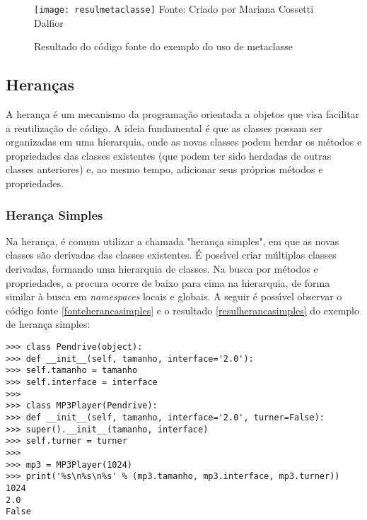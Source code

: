 \begin{figure}[H]
	\begin{center}
		\caption{Resultado do c\'{o}digo fonte do exemplo do uso de metaclasse} \label{resulmetaclasse}
		\texttt{[image: resulmetaclasse]} 
		\newline
		Fonte: Criado por Mariana Cossetti Dalfior
	\end{center}
\end{figure}

	\subsection{Heran\c{c}as}

A heran\c{c}a \'{e} um mecanismo da programa\c{c}\~{a}o orientada a objetos que visa facilitar a reutiliza\c{c}\~{a}o de c\'{o}digo. A ideia fundamental \'{e} que as classes possam ser organizadas em uma hierarquia, onde as novas classes podem herdar os m\'{e}todos e propriedades das classes existentes (que podem ter sido herdadas de outras classes anteriores) e, ao mesmo tempo, adicionar seus pr\'{o}prios m\'{e}todos e propriedades.

		\subsubsection{Heran\c{c}a Simples}
Na heran\c{c}a, \'{e} comum utilizar a chamada "heran\c{c}a simples", em que as novas classes s\~{a}o derivadas das classes existentes. \'{E} poss\'{\i}vel criar m\'{u}ltiplas classes derivadas, formando uma hierarquia de classes. Na busca por m\'{e}todos e propriedades, a procura ocorre de baixo para cima na hierarquia, de forma similar \`{a} busca em \textsl{namespaces} locais e globais. A seguir \'{e} poss\'{\i}vel observar o c\'{o}digo fonte \ref{fonteherancasimples} e o resultado \ref{resulherancasimples} do exemplo de heran\c{c}a simples:
			
\begin{lstlisting}
>>> class Pendrive(object):
>>> def __init__(self, tamanho, interface='2.0'):
>>> self.tamanho = tamanho
>>> self.interface = interface
>>> 
>>> class MP3Player(Pendrive):
>>> def __init__(self, tamanho, interface='2.0', turner=False):
>>> super().__init__(tamanho, interface)
>>> self.turner = turner
>>>
>>> mp3 = MP3Player(1024)
>>> print('%s\n%s\n%s' % (mp3.tamanho, mp3.interface, mp3.turner))
1024
2.0
False
\end{lstlisting}

